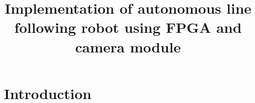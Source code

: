 \documentclass[a4paper,12pt]{article} %
\title{\textbf{Implementation of autonomous line following robot using FPGA and camera module}}
\date{}
\begin{document}

\maketitle

\section*{Introduction}








\end{document}
